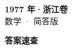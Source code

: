\documentclass[zihao=-4, a4paper]{ctexart}
\begin{document}
\begin{center}
  {\Large\bfseries 1977 年·浙江卷}\\[4pt]
  {\large 数学 · 简答版}
\end{center}
\medskip
{}

\clearpage
{}
\begin{center}{\Large\bfseries 答案速查}\end{center}
\medskip

\end{document}
